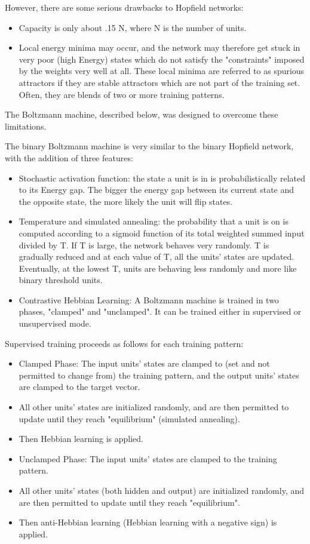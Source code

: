 However, there are some serious drawbacks to Hopfield networks:
\begin{itemize}
\item Capacity is only about .15 N, where N is the number of units.
\item Local energy minima may occur, and the network may therefore get stuck in very poor (high Energy) states which do not satisfy the "constraints" imposed by the weights very well at all. These local minima are referred to as spurious attractors if they are stable attractors which are not part of the training set. Often, they are blends of two or more training patterns.
\end{itemize}

The Boltzmann machine, described below, was designed to overcome these limitations.


The binary Boltzmann machine is very similar to the binary Hopfield network, with the addition of three features:
\begin{itemize}
\item Stochastic activation function: the state a unit is in is probabilistically related to its Energy gap. The bigger the energy gap between its current state and the opposite state, the more likely the unit will flip states.
\item Temperature and simulated annealing: the probability that a unit is on is computed according to a sigmoid function of its total weighted summed input divided by T. If T is large, the network behaves very randomly. T is gradually reduced and at each value of T, all the units' states are updated. Eventually, at the lowest T, units are behaving less randomly and more like binary threshold units.
\item Contrastive Hebbian Learning: A Boltzmann machine is trained in two phases, "clamped" and "unclamped". It can be trained either in supervised or unsupervised mode. 
\end{itemize}
Supervised training proceeds as follows for each training pattern:
\begin{itemize}
\item Clamped Phase: The input units' states are clamped to (set and not permitted to change from) the training pattern, and the output units' states are clamped to the target vector.
\item All other units' states are initialized randomly, and are then permitted to update until they reach "equilibrium" (simulated annealing).
\item Then Hebbian learning is applied.
\item Unclamped Phase: The input units' states are clamped to the training pattern.
\item All other units' states (both hidden and output) are initialized randomly, and are then permitted to update until they reach "equilibrium".
\item Then anti-Hebbian learning (Hebbian learning with a negative sign) is applied.
\end{itemize}

